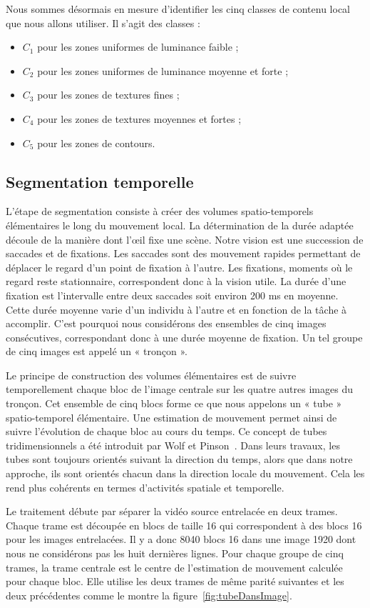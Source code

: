 Nous sommes désormais en mesure d'identifier les cinq classes de contenu local que nous allons utiliser. Il s'agit des classes :
\begin{itemize}
\item $C_1$ pour les zones uniformes de luminance faible ;
\item $C_2$ pour les zones uniformes de luminance moyenne et forte ;
\item $C_3$ pour les zones de textures fines ;
\item $C_4$ pour les zones de textures moyennes et fortes ;
\item $C_5$ pour les zones de contours.
\end{itemize}


\subsection{Segmentation temporelle}
L'étape de segmentation consiste à créer des volumes spatio-temporels élémentaires le long du mouvement local. La détermination de la durée adaptée découle de la manière dont l'\oe il fixe une scène. Notre vision est une succession de saccades et de fixations. Les saccades sont des mouvement rapides permettant de déplacer le regard d'un point de fixation à l'autre. Les fixations, moments où le regard reste stationnaire, correspondent donc à la vision utile. La durée d'une fixation est l'intervalle entre deux saccades soit environ 200 ms en moyenne. Cette durée moyenne varie d'un individu à l'autre et en fonction de la tâche à accomplir. C'est pourquoi nous considérons des ensembles de cinq images consécutives, correspondant donc à une durée moyenne de fixation. Un tel groupe de cinq images est appelé un « tronçon ».

Le principe de construction des volumes élémentaires est de suivre temporellement chaque bloc de l'image centrale sur les quatre autres images du tronçon. Cet ensemble de cinq blocs forme ce que nous appelons un « tube » spatio-temporel élémentaire. Une estimation de mouvement permet ainsi de suivre l'évolution de chaque bloc au cours du temps. Ce concept de tubes tridimensionnels a été introduit par Wolf et Pinson~\cite{wolf-spatempmetric}. Dans leurs travaux, les tubes sont toujours orientés suivant la direction du temps, alors que dans notre approche, ils sont orientés chacun dans la direction locale du mouvement. Cela les rend plus cohérents en termes d'activités spatiale et temporelle.

Le traitement débute par séparer la vidéo source entrelacée en deux trames. Chaque trame est découpée en blocs de taille 16 qui correspondent à des blocs 16 pour les images entrelacées. Il y a donc 8040 blocs 16 dans une image 1920 dont nous ne considérons pas les huit dernières lignes. Pour chaque groupe de cinq trames, la trame centrale est le centre de l'estimation de mouvement calculée pour chaque bloc. Elle utilise les deux trames de même parité suivantes et les deux précédentes comme le montre la figure~\ref{fig:tubeDansImage}.

